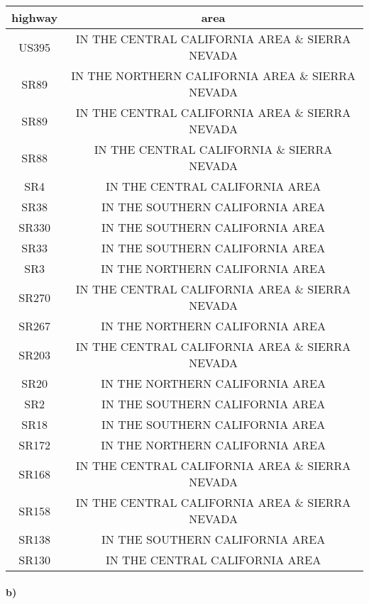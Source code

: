 \documentclass[12pt]{article}
\begin{document}
\begin{center}
        \hspace*{-4cm}
        \begin{tabular}{c|c}
                highway & area\\
                \hline
                US395 & IN THE CENTRAL CALIFORNIA AREA \& SIERRA NEVADA\\
                SR89 & IN THE NORTHERN CALIFORNIA AREA \& SIERRA NEVADA\\
                SR89 & IN THE CENTRAL CALIFORNIA AREA \& SIERRA NEVADA\\
                SR88 & IN THE CENTRAL CALIFORNIA \& SIERRA NEVADA\\
                SR4 & IN THE CENTRAL CALIFORNIA AREA\\
                SR38 & IN THE SOUTHERN CALIFORNIA AREA\\
                SR330 & IN THE SOUTHERN CALIFORNIA AREA\\
                SR33 & IN THE SOUTHERN CALIFORNIA AREA\\
                SR3 & IN THE NORTHERN CALIFORNIA AREA\\
                SR270 & IN THE CENTRAL CALIFORNIA AREA \& SIERRA NEVADA\\
                SR267 & IN THE NORTHERN CALIFORNIA AREA\\
                SR203 & IN THE CENTRAL CALIFORNIA AREA \& SIERRA NEVADA\\
                SR20 & IN THE NORTHERN CALIFORNIA AREA\\
                SR2 & IN THE SOUTHERN CALIFORNIA AREA\\
                SR18 & IN THE SOUTHERN CALIFORNIA AREA\\
                SR172 & IN THE NORTHERN CALIFORNIA AREA\\
                SR168 & IN THE CENTRAL CALIFORNIA AREA \& SIERRA NEVADA\\
                SR158 & IN THE CENTRAL CALIFORNIA AREA \& SIERRA NEVADA\\
                SR138 & IN THE SOUTHERN CALIFORNIA AREA\\
                SR130 & IN THE CENTRAL CALIFORNIA AREA
        \end{tabular}
        \hspace*{-4cm}
\end{center}

\paragraph{b)}
\end{document}
